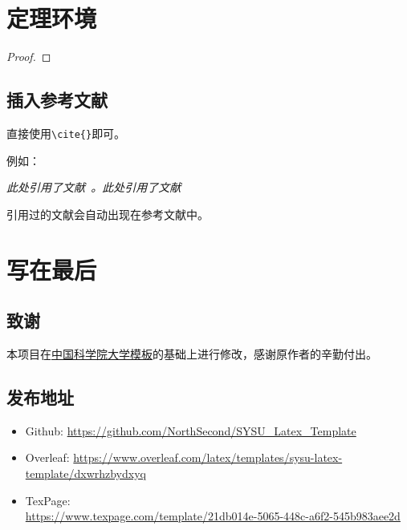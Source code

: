 \documentclass{SYSUReport}
\begin{document}
\section{定理环境}
\begin{Theorem}
\end{Theorem}

\begin{Lemma}
\end{Lemma}

\begin{Corollary}
\end{Corollary}

\begin{Proposition}
\end{Proposition}

\begin{Definition}
\end{Definition}

\begin{Example}
\end{Example}

\begin{proof}
\end{proof}

\subsection{插入参考文献}
直接使用\verb|\cite{}|即可。

例如：


\textit{ 此处引用了文献~\cite{0Isaac}。此处引用了文献~\cite{2016The}}


引用过的文献会自动出现在参考文献中。

\section{写在最后}

\subsection{致谢}

本项目在\href{https://github.com/jweihe/UCAS_Latex_Template}{中国科学院大学模板}的基础上进行修改，感谢原作者的辛勤付出。

\subsection{发布地址}
\begin{itemize}
    \item Github: \url{https://github.com/NorthSecond/SYSU_Latex_Template}
    \item Overleaf: \url{https://www.overleaf.com/latex/templates/sysu-latex-template/dxwrhzbydxyq}
    \item TexPage: \\
    \url{https://www.texpage.com/template/21db014e-5065-448c-a6f2-545b983aee2d}
\end{itemize}


\newpage


\end{document}
